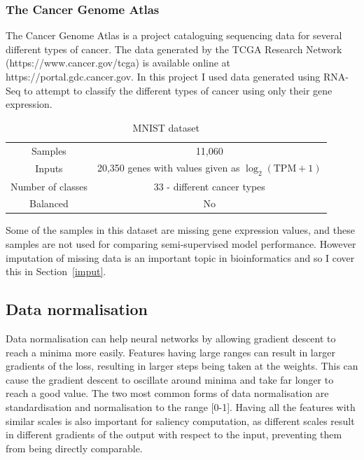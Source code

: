 \subsubsection{The Cancer Genome Atlas}
The Cancer Genome Atlas is a project cataloguing sequencing data for several different types of cancer. The data generated by the TCGA Research 
Network (https://www.cancer.gov/tcga) is available online at https://portal.gdc.cancer.gov. In this project I used data generated using 
RNA-Seq to attempt to classify the different types of cancer using only their gene expression.
\begin{table}[H]
  \label{tab:tcga}
  \small %
  \centering %
  \begin{tabular}{cc} %
  \toprule[\heavyrulewidth]
  Samples & 11,060 \\
  Inputs & 20,350 genes with values given as $\log_{2}(\text{TPM}+1)$ \footnotemark \\
  Number of classes & 33 - different cancer types\\
  Balanced & No \\
  \bottomrule[\heavyrulewidth] 
  \end{tabular}
  \caption{MNIST dataset} 
\end{table}

Some of the samples in this dataset are missing gene expression values, and these samples are not used for comparing semi-supervised model
performance. However imputation of missing data is an important topic in bioinformatics and so I cover this in Section~\ref{imput}.

\subsection{Data normalisation}
Data normalisation can help neural networks by allowing gradient descent to reach a minima more easily. Features having large ranges
can result in larger gradients of the loss, resulting in larger steps being taken at the weights. This can cause the 
gradient descent to oscillate around minima and take far longer to reach a good value. The two most common forms of data normalisation 
are standardisation and normalisation to the range [0-1]. Having all the features with similar scales is also important for saliency computation,
as different scales result in different gradients of the output with respect to the input, preventing them from being directly comparable.

